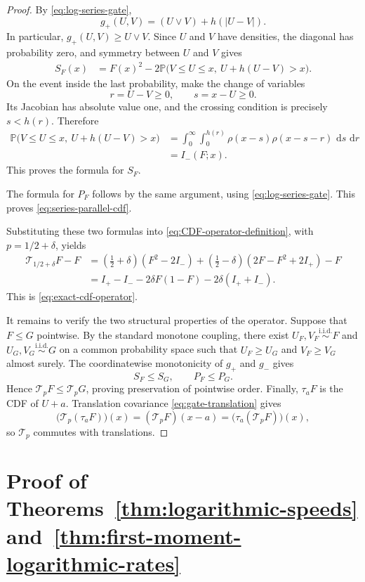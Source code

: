 \documentclass[12pt]{amsart}
\numberwithin{equation}{section}
\theoremstyle{plain}
\theoremstyle{definition}
\newcommand{\Pp}{\mathbb P}
\newcommand{\dd}{\,\mathrm d}
\begin{document}
\begin{proof}
By \eqref{eq:log-series-gate},
\[
 g_+(U,V)=(U\vee V)+h(|U-V|).
\]
In particular, $g_+(U,V)\ge U\vee V$.  Since $U$ and $V$ have densities,
the diagonal has probability zero, and
symmetry between $U$ and $V$ gives
\begin{align*}
 S_F(x)
 &=F(x)^2
   -2\Pp\bigl(V\le U\le x,\ U+h(U-V)>x\bigr).
\end{align*}
On the event inside the last probability, make the change of variables
\[
 r=U-V\ge0,
 \qquad
 s=x-U\ge0.
\]
Its Jacobian has absolute value one, and the crossing condition is precisely
$s<h(r)$.  Therefore
\[
\begin{aligned}
 \Pp\bigl(V\le U\le x,\ U+h(U-V)>x\bigr)
 &=\int_0^\infty\int_0^{h(r)}
   \rho(x-s)\rho(x-s-r)\,\dd s\,\dd r\\
 &=I_-(F;x).
\end{aligned}
\]
This proves the formula for $S_F$.

The formula for $P_F$ follows by the same argument, using
\eqref{eq:log-series-gate}.  This proves
\eqref{eq:series-parallel-cdf}.

Substituting these two formulas into
\eqref{eq:CDF-operator-definition}, with $p=1/2+\delta$, yields
\begin{align*}
 {\mathcal T_{1/2+\delta}F-F}
 &{=(\tfrac12+\delta)(F^2-2I_-)
   +(\tfrac12-\delta)(2F-F^2+2I_+)-F}\\
 &{=I_+-I_--2\delta F(1-F)-2\delta(I_++I_-).}
\end{align*}
This is \eqref{eq:exact-cdf-operator}.

It remains to verify the two structural properties of the operator.  Suppose
that $F\le G$ pointwise.  By the standard monotone coupling, there exist
$U_F,V_F\stackrel{\mathrm{i.i.d.}}{\sim}F$ and
$U_G,V_G\stackrel{\mathrm{i.i.d.}}{\sim}G$ on a common probability space such
that $U_F\ge U_G$ and $V_F\ge V_G$ almost surely.  The coordinatewise
monotonicity of $g_+$ and $g_-$ gives
\[
 S_F\le S_G,
 \qquad
 P_F\le P_G.
\]
Hence $\mathcal T_pF\le\mathcal T_pG$, proving preservation of pointwise
order.  Finally, $\tau_aF$ is the CDF of $U+a$.  Translation covariance
\eqref{eq:gate-translation} gives
\[
 \bigl(\mathcal T_p(\tau_aF)\bigr)(x)
 =(\mathcal T_pF)(x-a)
 =\bigl(\tau_a(\mathcal T_pF)\bigr)(x),
\]
so $\mathcal T_p$ commutes with translations.
\end{proof}

\section{Proof of Theorems~\ref{thm:logarithmic-speeds}
and~\ref{thm:first-moment-logarithmic-rates}}
\label{sec:ballistic-proof}
\end{document}
